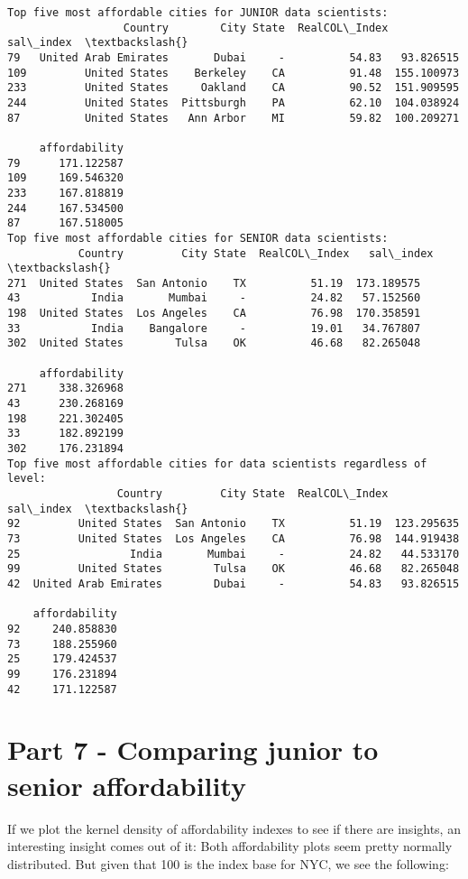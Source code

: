 \documentclass[11pt]{article}
\begin{document}
    \begin{Verbatim}[commandchars=\\\{\}]
Top five most affordable cities for JUNIOR data scientists:
                  Country        City State  RealCOL\_Index   sal\_index  \textbackslash{}
79   United Arab Emirates       Dubai     -          54.83   93.826515
109         United States    Berkeley    CA          91.48  155.100973
233         United States     Oakland    CA          90.52  151.909595
244         United States  Pittsburgh    PA          62.10  104.038924
87          United States   Ann Arbor    MI          59.82  100.209271

     affordability
79      171.122587
109     169.546320
233     167.818819
244     167.534500
87      167.518005
Top five most affordable cities for SENIOR data scientists:
           Country         City State  RealCOL\_Index   sal\_index  \textbackslash{}
271  United States  San Antonio    TX          51.19  173.189575
43           India       Mumbai     -          24.82   57.152560
198  United States  Los Angeles    CA          76.98  170.358591
33           India    Bangalore     -          19.01   34.767807
302  United States        Tulsa    OK          46.68   82.265048

     affordability
271     338.326968
43      230.268169
198     221.302405
33      182.892199
302     176.231894
Top five most affordable cities for data scientists regardless of level:
                 Country         City State  RealCOL\_Index   sal\_index  \textbackslash{}
92         United States  San Antonio    TX          51.19  123.295635
73         United States  Los Angeles    CA          76.98  144.919438
25                 India       Mumbai     -          24.82   44.533170
99         United States        Tulsa    OK          46.68   82.265048
42  United Arab Emirates        Dubai     -          54.83   93.826515

    affordability
92     240.858830
73     188.255960
25     179.424537
99     176.231894
42     171.122587
    \end{Verbatim}

    \hypertarget{part-7---comparing-junior-to-senior-affordability}{%
\section{Part 7 - Comparing junior to senior
affordability}\label{part-7---comparing-junior-to-senior-affordability}}

    If we plot the kernel density of affordability indexes to see if there
are insights, an interesting insight comes out of it: Both affordability
plots seem pretty normally distributed. But given that 100 is the index
base for NYC, we see the following:
\end{document}
